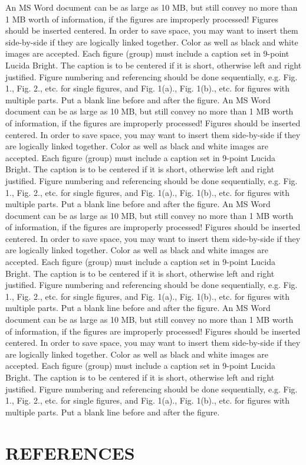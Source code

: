 \documentclass[9pt,a4paper]{article}
\begin{document}
An MS Word document can be as large as 10 MB, but still convey no more than 1 MB worth of information, if the figures are improperly processed! Figures should be inserted centered. In order to save space, you may want to insert them side-by-side if they are logically linked together. Color as well as black and white images are accepted. Each figure (group) must include a caption set in 9-point Lucida Bright. The caption is to be centered if it is short, otherwise left and right justified. Figure numbering and referencing should be done sequentially, e.g. Fig. 1., Fig. 2., etc. for single figures, and Fig. 1(a)., Fig. 1(b)., etc. for figures with multiple parts. Put a blank line before and after the figure.
An MS Word document can be as large as 10 MB, but still convey no more than 1 MB worth of information, if the figures are improperly processed! Figures should be inserted centered. In order to save space, you may want to insert them side-by-side if they are logically linked together. Color as well as black and white images are accepted. Each figure (group) must include a caption set in 9-point Lucida Bright. The caption is to be centered if it is short, otherwise left and right justified. Figure numbering and referencing should be done sequentially, e.g. Fig. 1., Fig. 2., etc. for single figures, and Fig. 1(a)., Fig. 1(b)., etc. for figures with multiple parts. Put a blank line before and after the figure.
An MS Word document can be as large as 10 MB, but still convey no more than 1 MB worth of information, if the figures are improperly processed! Figures should be inserted centered. In order to save space, you may want to insert them side-by-side if they are logically linked together. Color as well as black and white images are accepted. Each figure (group) must include a caption set in 9-point Lucida Bright. The caption is to be centered if it is short, otherwise left and right justified. Figure numbering and referencing should be done sequentially, e.g. Fig. 1., Fig. 2., etc. for single figures, and Fig. 1(a)., Fig. 1(b)., etc. for figures with multiple parts. Put a blank line before and after the figure.
An MS Word document can be as large as 10 MB, but still convey no more than 1 MB worth of information, if the figures are improperly processed! Figures should be inserted centered. In order to save space, you may want to insert them side-by-side if they are logically linked together. Color as well as black and white images are accepted. Each figure (group) must include a caption set in 9-point Lucida Bright. The caption is to be centered if it is short, otherwise left and right justified. Figure numbering and referencing should be done sequentially, e.g. Fig. 1., Fig. 2., etc. for single figures, and Fig. 1(a)., Fig. 1(b)., etc. for figures with multiple parts. Put a blank line before and after the figure.

\section{REFERENCES}


%

\end{document}
